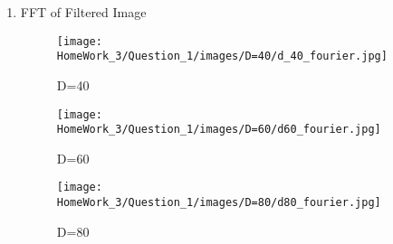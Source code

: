 \documentclass{article}
\begin{document}
\begin{enumerate}
\begin{enumerate}
    \item FFT of Filtered Image
        \begin{figure}[!h]
            \centering
            \begin{minipage}{0.3\textwidth}
                \texttt{[image: HomeWork\_3/Question\_1/images/D=40/d\_40\_fourier.jpg]}
                \caption{D=40}
            \end{minipage}
            \hfill
                \centering
            \begin{minipage}{0.3\textwidth}
                \texttt{[image: HomeWork\_3/Question\_1/images/D=60/d60\_fourier.jpg]}
                \caption{D=60}
            \end{minipage}
            \hfill
                \centering
            \begin{minipage}{0.3\textwidth}
                \texttt{[image: HomeWork\_3/Question\_1/images/D=80/d80\_fourier.jpg]}
                \caption{D=80}
            \end{minipage}
            \hfill
        \end{figure}
\end{enumerate}


\end{enumerate}
\end{document}
